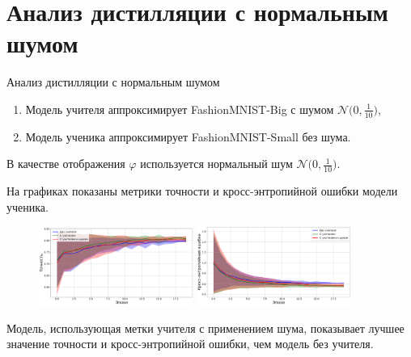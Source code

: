 \documentclass[10pt,pdf,hyperref={unicode}]{beamer}
\begin{document}
\section{Анализ дистилляции с нормальным шумом}
\begin{frame}{Анализ дистилляции с нормальным шумом}
\justifying
\begin{enumerate}[1)]
    \item Модель учителя аппроксимирует FashionMNIST-Big с шумом $\mathcal{N}\bigr(0,\frac{1}{10}\bigr)$,
    \item Модель ученика аппроксимирует FashionMNIST-Small без шума.
\end{enumerate}

\par
В качестве отображения $\varphi$ используется нормальный шум $\mathcal{N}\bigr(0,\frac{1}{10}\bigr)$.

На графиках показаны метрики точности и кросс-энтропийной ошибки модели ученика.

\begin{figure}[h!]
\includegraphics[width=0.45\textwidth]{results/noise_acc.png}
\includegraphics[width=0.45\textwidth]{results/noise_loss.png}
\end{figure}

Модель, использующая метки учителя с применением шума, показывает лучшее значение точности и кросс-энтропийной ошибки, чем модель без учителя.

\end{frame}

\end{document}
